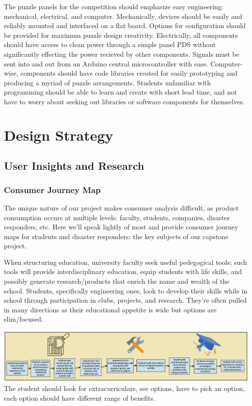 \documentclass[a4paper, 10pt]{article}
\begin{document}
	The puzzle panels for the competition should emphasize easy engineering: mechanical, electrical, and computer. Mechanically, devices should be easily and reliably mounted and interfaced on a flat board. Options for configuration should be provided for maximum puzzle design creativity. Electrically, all components should have access to clean power through a simple panel PDS without significantly effecting the power recieved by other components. Signals must be sent into and out from an Arduino central microcontroller with ease. Computer-wise, components should have code libraries created for easily prototyping and producing a myriad of puzzle arrangements. Students unfamiliar with programming should be able to learn and create with short lead time, and not have to worry about seeking out libraries or software components for themselves. 
	
\pagebreak

\section{Design Strategy}
	\subsection{User Insights and Research} 
		\subsubsection{Consumer Journey Map}
		The unique nature of our project makes consumer analysis difficult, as product consumption occurs at multiple levels: faculty, students, companies, disaster responders, etc. Here we'll speak lightly of most and provide consumer journey maps for students and disaster responders: the key subjects of our capstone project.
		
		When structuring education, university faculty seek useful pedegogical tools; such tools will provide  interdisciplinary education, equip students with life skills, and possibly generate research/products that enrich the name and wealth of the school. Students, specifically engineering ones, look to develop their skills while in school through participation in clubs, projects, and research. They're often pulled in many directions as their educational appetite is wide but options are slim/focused.
		
		\includegraphics[scale=0.5]{Student Consumer Map}
		The student should look for extracurriculars, see options, have to pick an option, each option should have different range of benefits.
		
\end{document}
